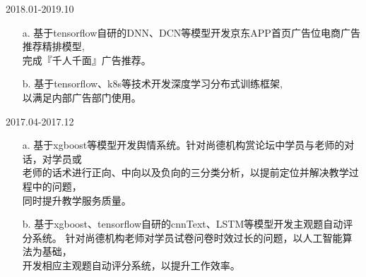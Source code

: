 \documentclass[margin]{res}
\begin{document}
\begin{resume}
                {} \hfill 2018.01-2019.10 \\
                 \begin{itemize}  \itemsep -2pt %
                    \item[a.] 基于tensorflow自研的DNN、DCN等模型开发京东APP首页广告位电商广告推荐精排模型,\\完成『千人千面』广告推荐。
                    \item[b.] 基于tensorflow、k8s等技术开发深度学习分布式训练框架,\\以满足内部广告部门使用。
                 \end{itemize} 

                {} \hfill 2017.04-2017.12 \\
                \begin{itemize}
                    \item[a.] 基于xgboost等模型开发舆情系统。针对尚德机构赏论坛中学员与老师的对话，对学员或\\老师的话术进行正向、中向以及负向的三分类分析，以提前定位并解决教学过程中的问题，\\同时提升教学服务质量。
                    \item[b.] 基于xgboost、tensorflow自研的cnnText、LSTM等模型开发主观题自动评分系统。 针对尚德机构老师对学员试卷问卷时效过长的问题，以人工智能算法为基础，\\开发相应主观题自动评分系统，以提升工作效率。
                \end{itemize} 


\end{resume}
\end{document}
